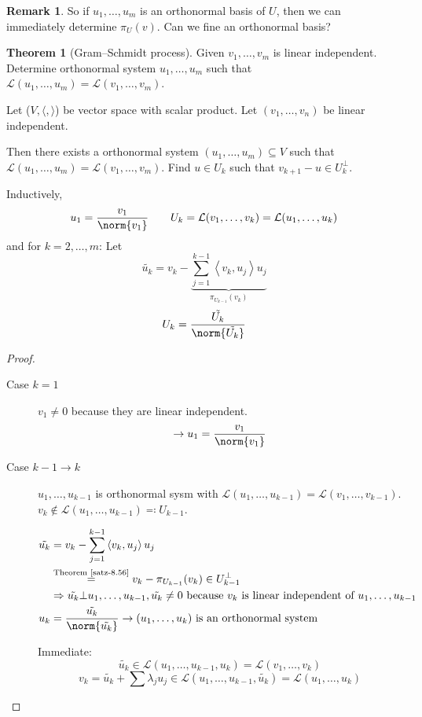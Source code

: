 \documentclass[a4paper,landscape,twocolumn]{article}
\newcommand\functional[1]{\left\langle{#1}\right\rangle}
\theoremstyle{definition}
\newtheorem{theorem}{Theorem}
\newtheorem{rem}{Remark}
\DeclarePairedDelimiter\norm\lVert\rVert
\begin{document}
\begin{rem}
  So if $u_1, \ldots, u_m$ is an orthonormal basis of $U$,
  then we can immediately determine $\pi_U(v)$.
  Can we fine an orthonormal basis?
\end{rem}

\begin{theorem}[Gram–Schmidt process]
  \label{satz-8.57}
  Given $v_1, \ldots, v_m$ is linear independent.
  Determine orthonormal system $u_1, \ldots, u_m$
  such that $\mathcal L(u_1, \ldots, u_m) = \mathcal L(v_1, \ldots, v_m)$.

  Let ($V, \langle, \rangle$) be vector space with scalar product.
  Let $(v_1, \ldots, v_n)$ be linear independent.

  Then there exists a orthonormal system $(u_1, \ldots, u_m) \subseteq V$
  such that $\mathcal L(u_1, \ldots, u_m) = \mathcal L(v_1, \ldots, v_m)$.
  Find $u \in U_k$ such that $v_{k+1} - u \in U_k^\bot$.

  Inductively,
  \[ u_1 = \frac{v_1}{\norm{v_1}} \qquad U_k = \mathcal L(v_1, \ldots, v_k) = \mathcal L(u_1, \ldots, u_k) \]
  and for $k=2, \ldots, m$:
  Let
  \[ \tilde{u_k} = v_k - \underbrace{\sum_{j=1}^{k-1} \functional{v_k, u_j} u_j}_{\pi_{U_{k-1}}(v_k)} \]
  \[ U_k = \frac{\tilde{U_k}}{\norm{\tilde{U_k}}} \]
\end{theorem}
\begin{proof}
  \begin{description}
    \item[Case $k=1$]
      $v_1 \neq 0$ because they are linear independent.
      \[ \rightarrow u_1 = \frac{v_1}{\norm{v_1}} \]
    \item[Case $k-1\to k$]
      $u_1,\ldots,u_{k-1}$ is orthonormal sysm with $\mathcal L(u_1, \ldots, u_{k-1}) = \mathcal L(v_1, \ldots, v_{k-1})$.
      $v_k \not\in \mathcal L(u_1, \ldots, u_{k-1}) \eqqcolon U_{k-1}$.

      \begin{align*}
        \tilde{u_k} &= v_k - \sum_{j=1}^{k-1} \functional{v_k, u_j} u_j \\
          &\overset{\text{Theorem~\ref{satz-8.56}}}{=} v_k - \pi_{U_{k-1}}(v_k) \in U_{k-1}^\bot \\
          &\Rightarrow \tilde{u_k} \bot u_1, \ldots, u_{k-1}, \tilde{u_k} \neq 0 \text{ because } v_k \text{ is linear independent of } u_1, \ldots, u_{k-1} \\
        u_k &= \frac{\tilde{u_k}}{\norm{\tilde{u_k}}} \to (u_1, \ldots, u_k) \text{ is an orthonormal system}
      \end{align*}

      Immediate:
      \[ \tilde{u_k} \in \mathcal L(u_1, \ldots, u_{k-1}, u_k) = \mathcal L(v_1, \ldots, v_k) \]
      \[ v_k = \tilde{u_k} + \sum \lambda_j u_j \in \mathcal L(u_1, \ldots, u_{k-1}, \tilde{u_k}) = \mathcal L(u_1, \ldots, u_k) \]
  \end{description}
\end{proof}
\end{document}
